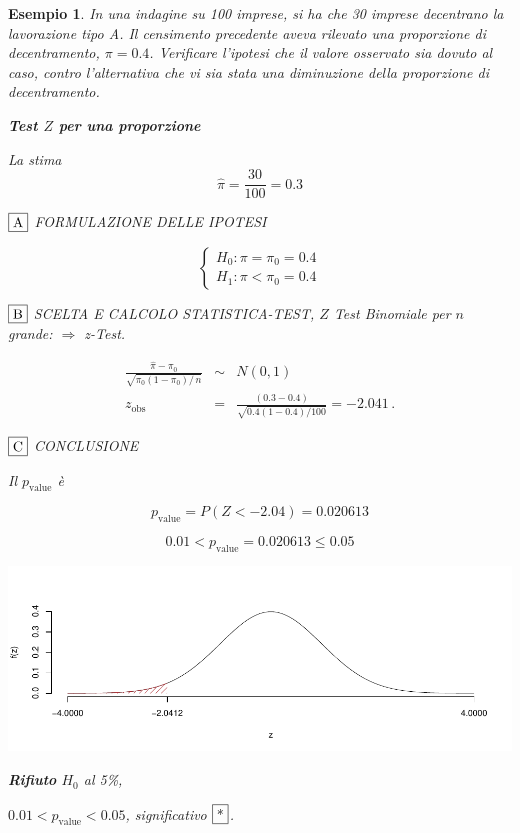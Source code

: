 \documentclass[
  11pt,
]{book}
\theoremstyle{mytheoremstyle}
\theoremstyle{mydefstyle}
\newtheorem{example}{{Esempio}}[section]
\begin{document}
\begin{example}
In una indagine su 100 imprese, si ha che 30 imprese decentrano la
lavorazione tipo A. Il censimento precedente aveva rilevato una
proporzione di decentramento, \(\pi = 0.4\). Verificare l'ipotesi
che il valore osservato sia dovuto al caso, contro
l'alternativa che vi sia stata una diminuzione della proporzione di
decentramento.

\textbf{Test \(Z\) per una proporzione}

La stima
\[\hat\pi=\frac { 30 } { 100 }= 0.3  \]

\(\fbox{A}\) FORMULAZIONE DELLE IPOTESI

\[\begin{cases}
   H_0: \pi = \pi_0=0.4 \\
   H_1: \pi < \pi_0=0.4 
   \end{cases}\]

\(\fbox{B}\) SCELTA E CALCOLO STATISTICA-TEST, \(Z\)
Test Binomiale per \(n\) grande: \(\Rightarrow\) z-Test.

\begin{eqnarray*}
   \frac{\hat\pi - \pi_{0}} {\sqrt {\pi_0(1-\pi_0)/\,n}}&\sim&N(0,1)\\
   z_{\text{obs}}
   &=& \frac{ ( 0.3 -  0.4 )} {\sqrt{ 0.4 (1- 0.4 )/ 100 }}
   =   -2.041 \,.
   \end{eqnarray*}

\(\fbox{C}\) CONCLUSIONE

Il \(p_{\text{value}}\) è

\[ p_{\text{value}} = P(Z<-2.04)=0.020613 \]

\[
 0.01 < p_\text{value}= 0.020613 \leq 0.05 
\]

\begin{center}\includegraphics{Appunti_di_Statistica_2025_files/figure-latex/15-test-mu-pi-12-1} \end{center}

\textbf{Rifiuto} \(H_0\) al 5\%,

\(0.01<p_\text{value}<0.05\), \emph{significativo} \(\fbox{*}\).
\end{example}
\end{document}
